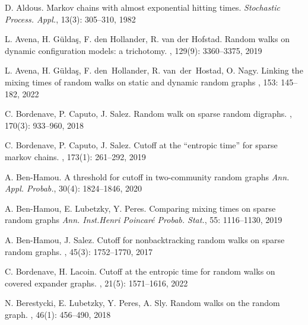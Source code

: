 \documentclass[11pt,oneside]{amsart}
\numberwithin{equation}{section}  %
\theoremstyle{plain}
\begin{document}
\begin{thebibliography}{}


	D. Aldous.
\newblock	Markov chains with almost exponential hitting times.
{\em Stochastic Process. Appl.}, 13(3): 305--310, 1982
	
	L. Avena, H. G{\"u}ldaş, F. den Hollander, R. van der Hofstad.
	\newblock Random walks on dynamic configuration models: a trichotomy.
	, 129(9): 3360--3375, 2019
	
	L. Avena, H. G{\"u}ldaş, F. den~Hollander, R. van~der~Hostad, O. Nagy.
	\newblock Linking the mixing times of random walks on static and dynamic random graphs
	, 153: 145--182, 2022

	C. Bordenave, P. Caputo, J. Salez.
	\newblock Random walk on sparse random digraphs.
	, 170(3): 933--960, 2018
	
	
	C. Bordenave, P. Caputo, J. Salez.
	\newblock Cutoff at the ``entropic time'' for sparse markov chains.
	, 173(1): 261--292, 2019

	
	A. Ben-Hamou. 
	 	\newblock A threshold for cutoff in two-community random graphs 
	{\em Ann. Appl. Probab.},
	 30(4): 1824--1846, 2020

	A. Ben-Hamou, 	E. Lubetzky, Y. Peres.
 	\newblock Comparing mixing times on sparse random graphs
	{\em Ann. Inst.Henri Poincaré Probab. Stat.}, 55: 1116--1130, 2019

    

	A. Ben-Hamou, J. Salez.
	\newblock Cutoff for nonbacktracking random walks on sparse random graphs.
	, 45(3): 1752--1770, 2017


	
	C. Bordenave, H. Lacoin.
	\newblock Cutoff at the entropic time for random walks on covered
	 expander graphs.
	 	, 21(5): 1571--1616, 2022	



	N. Berestycki, E. Lubetzky, Y. Peres, A. Sly.
	\newblock Random walks on the random graph.
	, 46(1): 456--490, 2018



\end{thebibliography}
\end{document}
